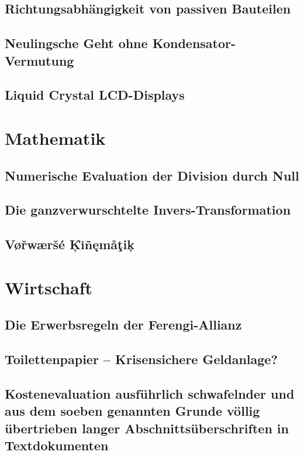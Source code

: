 		\subsection{Richtungsabhängigkeit von passiven Bauteilen}
			\blindtext
		\subsection{Neulingsche \glqq Geht ohne Kondensator\grqq-Vermutung}
			\blindtext
		\subsection{Liquid Crystal LCD-Displays}
			\blindtext
		
	\section{Mathematik}
		\subsection{Numerische Evaluation der Division durch Null}
			\blindtext
		\subsection{Die ganzverwurschtelte Invers-Transformation}
			\blindtext
		\subsection{V\o{}\v{r}w\ae{}r\v{s}\'{e} \c{K}\"{\i}\~{n}\k{e}m\aa{}\c{t}i\c{k}}
			\blindtext
		
	\section{Wirtschaft}
		\subsection{Die Erwerbsregeln der Ferengi-Allianz}
			\blindtext
			
		\subsection{Toilettenpapier -- Krisensichere Geldanlage?}
			\blindtext
			
		\subsection{Kostenevaluation ausführlich schwafelnder und aus dem soeben genannten Grunde völlig übertrieben langer Abschnittsüberschriften in Textdokumenten}
			\blindtext
			
